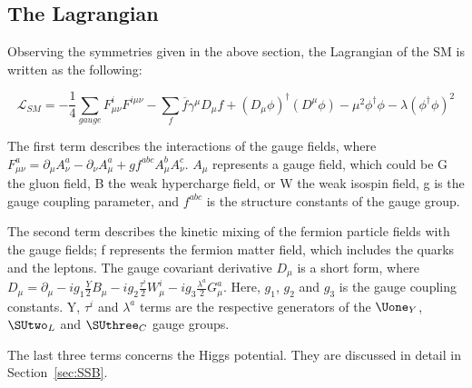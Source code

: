 \subsection{The Lagrangian}

Observing the symmetries given in the above section, the Lagrangian of the SM is written as the following:

\begin{equation}
    \mathcal{L}_{SM}= - \frac{1}{4} \sum\limits_{gauge} F^{i}_{\mu \nu}F^{i\mu\nu} - \sum\limits_{f} \overline{f} \gamma^{\mu} D_{\mu} f +(D_{\mu}\phi)^{\dagger}(D^{\mu}\phi) - \mu^{2}\phi^{\dagger}\phi - \lambda(\phi^{\dagger}\phi)^{2}
    \label{eq:SMLagrangian}
\end{equation}

The first term describes the interactions of the gauge fields, where $F^{a}_{\mu\nu}=\partial_{\mu}A_{\nu}^{a}-\partial_{\nu}A_{\mu}^{a}+g f^{abc}A^{b}_{\mu}A^{c}_{\nu}$. $A_{\mu}$ represents a gauge field, which could be G the gluon field, B the weak hypercharge field, or W the weak isospin field, g is the gauge coupling parameter, and $f^{abc}$ is the structure constants of the gauge group. 

The second term describes the kinetic mixing of the fermion particle fields with the gauge fields; f represents the fermion matter field, which includes the quarks and the leptons. The gauge covariant derivative $D_{\mu}$ is a short form, where $D_{\mu}=\partial_{\mu}-i g_{1} \frac{Y}{2}B_{\mu} - i g_{2}\frac{\tau ^{i}}{2}W_{\mu}^{i} - ig_{3}\frac{\lambda^{a}}{2}G^{a}_{\mu}$. Here, $g_{1}$, $g_{2}$ and $g_{3}$ is the gauge coupling constants. Y, $\tau ^{i}$ and $\lambda^{a}$ terms are the respective generators of the $\Uone_{Y}$, $\SUtwo_{L}$ and $\SUthree_{C}$ gauge groups.

The last three terms concerns the Higgs potential. They are discussed in detail in Section~\ref{sec:SSB}.

